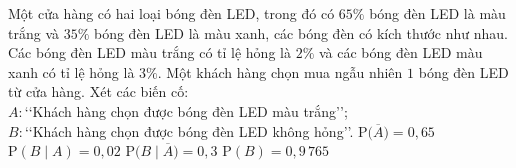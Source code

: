 \begin{ex}%
	Một cửa hàng có hai loại bóng đèn LED, trong đó có $65 \%$ bóng đèn LED là màu trắng và $35 \%$ bóng đèn LED là màu xanh, các bóng đèn có kích thước như nhau. Các bóng đèn LED màu trắng có tỉ lệ hỏng là $2 \%$ và các bóng đèn LED màu xanh có tỉ lệ hỏng là $3 \%$.  Một khách hàng chọn mua ngẫu nhiên $1$ bóng đèn LED từ cửa hàng. Xét các biến cố:\\
	$A\colon$\lq\lq Khách hàng chọn  được bóng đèn LED màu trắng\rq\rq;\\
	$B\colon$\lq\lq Khách hàng chọn được bóng đèn  LED không hỏng\rq\rq.
	\choiceTF 
		{$\mathrm{P}\big(\overline{A}\big)=0{,}65$} 
		{$\mathrm{P}(B \mid A)=0{,}02$} 
		{$\mathrm{P}\big(B \mid \overline{A}\big)=0{,}3$} 
		{\True  $\mathrm{P}(B)=0{,}9\,765$}
\end{ex}


